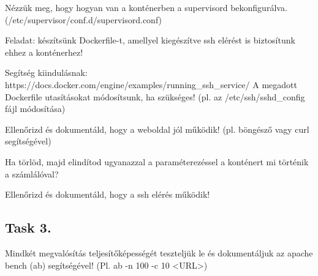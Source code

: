 \documentclass[a4paper]{article}
\begin{document}
Nézzük meg, hogy hogyan van a konténerben a supervisord bekonfigurálva. (/etc/supervisor/conf.d/supervisord.conf)

Feladat: készítsünk Dockerfile-t, amellyel kiegészítve ssh elérést is biztosítunk ehhez a konténerhez!

Segítség kiindulásnak: https://docs.docker.com/engine/examples/running_ssh_service/ A megadott Dockerfile utasításokat módosítsunk, ha szükséges! (pl. az /etc/ssh/sshd_config fájl módosítása)

Ellenőrizd és dokumentáld, hogy a weboldal jól működik! (pl. böngésző vagy curl segítségével)

Ha törlöd, majd elindítod ugyanazzal a paraméterezéssel a konténert mi történik a számlálóval?

Ellenőrizd és dokumentáld, hogy a ssh elérés működik!

\subsection{Task 3.}

Mindkét megvalósítás teljesítőképességét teszteljük le és dokumentáljuk az apache bench (ab) segítségével! (Pl. ab -n 100 -c 10 <URL>)
\end{document}
